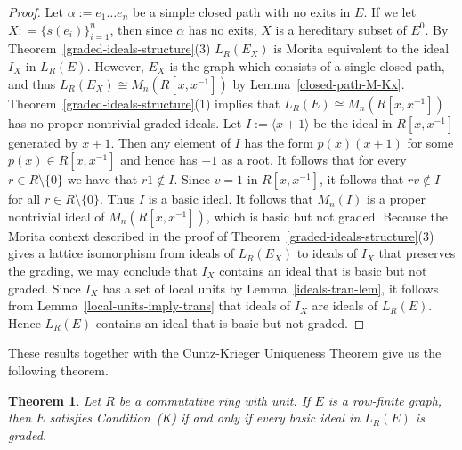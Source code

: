\documentclass[11pt]{amsart}
\newtheorem{theorem}{Theorem}[section]
\theoremstyle{remark}
\numberwithin{equation}{section}
\begin{document}
\begin{proof}
Let $\alpha := e_1 \ldots e_n$ be a simple closed path with no exits in $E$.  If we let $X : = \{s(e_i) \}_{i=1}^n$, then since $\alpha$ has no exits, $X$ is a hereditary subset of $E^0$.  By Theorem~\ref{graded-ideals-structure}(3) $L_R(E_X)$ is Morita equivalent to the ideal $I_X$ in $L_R(E)$.  However, $E_X$ is the graph which consists of a single closed path, and thus $L_R(E_X) \cong M_n(R[x,x^{-1}])$ by Lemma~\ref{closed-path-M-Kx}.  Theorem~\ref{graded-ideals-structure}(1) implies that $L_R(E) \cong M_n(R[x,x^{-1}])$ has no proper nontrivial graded ideals.  Let $I := \langle x+1 \rangle$ be the ideal in $R[x, x^{-1}]$ generated by $x+1$.  Then any element of $I$ has the form $p(x) (x+1)$ for some $p(x) \in R[x,x^{-1}]$ and hence has $-1$ as a root.  It follows that for every $r \in R \setminus \{ 0 \}$ we have that $r1 \notin I$.  Since $v = 1$ in $R[x, x^{-1}]$, it follows that $rv \notin I$ for all  $r \in R \setminus \{ 0 \}$.  Thus $I$ is a basic ideal.  It follows that $M_n(I)$ is a proper nontrivial ideal of  $M_n( R[x, x^{-1}])$, which is basic but not graded.  Because the Morita context described in the proof of Theorem~\ref{graded-ideals-structure}(3) gives a lattice isomorphism from ideals of $L_R(E_X)$ to ideals of $I_X$ that preserves the grading, we may conclude that $I_X$ contains an ideal that is basic but not graded.  Since $I_X$ has a set of local units by Lemma~\ref{ideals-tran-lem}, it follows from Lemma~\ref{local-units-imply-trans} that ideals of $I_X$ are ideals of $L_R(E)$.  Hence $L_R(E)$ contains an ideal that is basic but not graded.  
\end{proof}


These results together with the Cuntz-Krieger Uniqueness Theorem give us the following theorem.



\begin{theorem} \label{K-iff-ideals-graded}
Let $R$ be a commutative ring with unit.  If $E$ is a row-finite graph, then $E$ satisfies Condition~(K) if and only if every basic ideal in $L_R(E)$ is graded.
\end{theorem}
\end{document}
